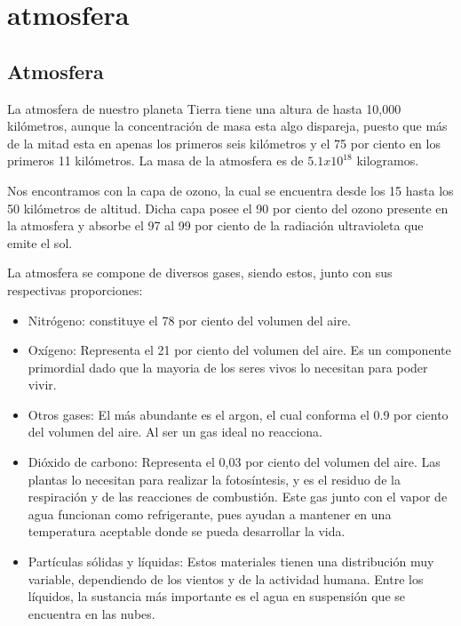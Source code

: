 \documentclass[a4paper,12pt]{report}
\begin{document}
\tableofcontents

\chapter{atmosfera}
\section{Atmosfera}
La atmosfera de nuestro planeta Tierra tiene una altura de hasta 10,000 kilómetros, aunque la concentración de masa esta algo dispareja, puesto que más de la mitad esta en apenas los primeros seis kilómetros y el 75 por ciento en los primeros 11 kilómetros. La masa de la atmosfera es de $5.1x10^18$ kilogramos.

Nos encontramos con la capa de ozono, la cual se encuentra desde los 15 hasta los 50 kilómetros de altitud.  Dicha capa posee el 90 por ciento del ozono presente en la atmosfera y absorbe el 97 al 99 por ciento de la radiación ultravioleta que emite el sol.

La atmosfera se compone de diversos gases, siendo estos, junto con sus respectivas proporciones:

\begin{itemize}
\item Nitrógeno: constituye el 78 por ciento del volumen del aire. 

\item Oxígeno: Representa el 21 por ciento del volumen del aire. Es un componente primordial dado que la mayoria de los seres vivos lo necesitan para poder vivir.

\item Otros gases: El más abundante es el argon, el cual conforma el 0.9 por ciento del volumen del aire. Al ser un gas ideal no reacciona.

\item Dióxido de carbono: Representa el 0,03 por ciento del volumen del aire. Las plantas lo necesitan para realizar la fotosíntesis, y es el residuo de la respiración y de las reacciones de combustión. Este gas junto con el vapor de agua funcionan como refrigerante, pues ayudan a mantener en una temperatura aceptable donde se pueda desarrollar la vida.

\item Partículas sólidas y líquidas: Estos materiales tienen una distribución muy variable, dependiendo de los vientos y de la actividad humana. Entre los líquidos, la sustancia más importante es el agua en suspensión que se encuentra en las nubes.

\end{itemize}
\end{document}
